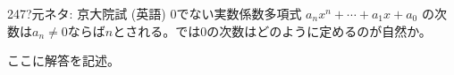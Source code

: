 \begin{thm}{247}{\hosi ?}{元ネタ: 京大院試 (英語)}
 0でない実数係数多項式 $a_nx^n+\cdots +a_1x+a_0$ の次数は$a_n\neq 0$ならば$n$とされる。では0の次数はどのように定めるのが自然か。
\end{thm}

ここに解答を記述。